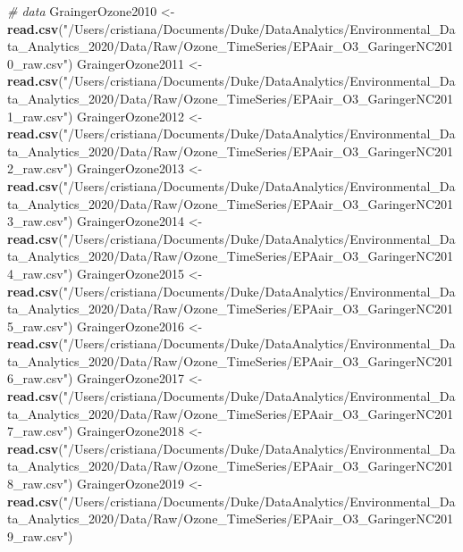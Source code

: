 \documentclass[]{article}
\newenvironment{Shaded}{\begin{snugshade}}{\end{snugshade}}
\newcommand{\CommentTok}[1]{\textcolor[rgb]{0.56,0.35,0.01}{\textit{#1}}}
\newcommand{\KeywordTok}[1]{\textcolor[rgb]{0.13,0.29,0.53}{\textbf{#1}}}
\newcommand{\NormalTok}[1]{#1}
\newcommand{\StringTok}[1]{\textcolor[rgb]{0.31,0.60,0.02}{#1}}
\begin{document}
\begin{Shaded}
\begin{Highlighting}[]
\CommentTok{# data}
\NormalTok{GraingerOzone2010 <-}\StringTok{ }\KeywordTok{read.csv}\NormalTok{(}\StringTok{"/Users/cristiana/Documents/Duke/DataAnalytics/Environmental_Data_Analytics_2020/Data/Raw/Ozone_TimeSeries/EPAair_O3_GaringerNC2010_raw.csv"}\NormalTok{)}
\NormalTok{GraingerOzone2011 <-}\StringTok{ }\KeywordTok{read.csv}\NormalTok{(}\StringTok{"/Users/cristiana/Documents/Duke/DataAnalytics/Environmental_Data_Analytics_2020/Data/Raw/Ozone_TimeSeries/EPAair_O3_GaringerNC2011_raw.csv"}\NormalTok{)}
\NormalTok{GraingerOzone2012 <-}\StringTok{ }\KeywordTok{read.csv}\NormalTok{(}\StringTok{"/Users/cristiana/Documents/Duke/DataAnalytics/Environmental_Data_Analytics_2020/Data/Raw/Ozone_TimeSeries/EPAair_O3_GaringerNC2012_raw.csv"}\NormalTok{)}
\NormalTok{GraingerOzone2013 <-}\StringTok{ }\KeywordTok{read.csv}\NormalTok{(}\StringTok{"/Users/cristiana/Documents/Duke/DataAnalytics/Environmental_Data_Analytics_2020/Data/Raw/Ozone_TimeSeries/EPAair_O3_GaringerNC2013_raw.csv"}\NormalTok{)}
\NormalTok{GraingerOzone2014 <-}\StringTok{ }\KeywordTok{read.csv}\NormalTok{(}\StringTok{"/Users/cristiana/Documents/Duke/DataAnalytics/Environmental_Data_Analytics_2020/Data/Raw/Ozone_TimeSeries/EPAair_O3_GaringerNC2014_raw.csv"}\NormalTok{)}
\NormalTok{GraingerOzone2015 <-}\StringTok{ }\KeywordTok{read.csv}\NormalTok{(}\StringTok{"/Users/cristiana/Documents/Duke/DataAnalytics/Environmental_Data_Analytics_2020/Data/Raw/Ozone_TimeSeries/EPAair_O3_GaringerNC2015_raw.csv"}\NormalTok{)}
\NormalTok{GraingerOzone2016 <-}\StringTok{ }\KeywordTok{read.csv}\NormalTok{(}\StringTok{"/Users/cristiana/Documents/Duke/DataAnalytics/Environmental_Data_Analytics_2020/Data/Raw/Ozone_TimeSeries/EPAair_O3_GaringerNC2016_raw.csv"}\NormalTok{)}
\NormalTok{GraingerOzone2017 <-}\StringTok{ }\KeywordTok{read.csv}\NormalTok{(}\StringTok{"/Users/cristiana/Documents/Duke/DataAnalytics/Environmental_Data_Analytics_2020/Data/Raw/Ozone_TimeSeries/EPAair_O3_GaringerNC2017_raw.csv"}\NormalTok{)}
\NormalTok{GraingerOzone2018 <-}\StringTok{ }\KeywordTok{read.csv}\NormalTok{(}\StringTok{"/Users/cristiana/Documents/Duke/DataAnalytics/Environmental_Data_Analytics_2020/Data/Raw/Ozone_TimeSeries/EPAair_O3_GaringerNC2018_raw.csv"}\NormalTok{)}
\NormalTok{GraingerOzone2019 <-}\StringTok{ }\KeywordTok{read.csv}\NormalTok{(}\StringTok{"/Users/cristiana/Documents/Duke/DataAnalytics/Environmental_Data_Analytics_2020/Data/Raw/Ozone_TimeSeries/EPAair_O3_GaringerNC2019_raw.csv"}\NormalTok{)}
\end{Highlighting}
\end{Shaded}
\end{document}
